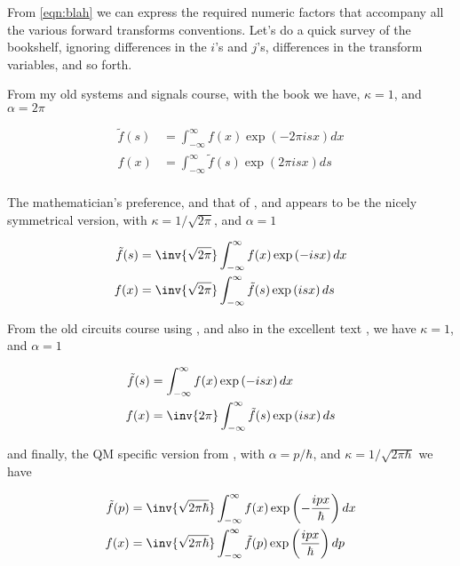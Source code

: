 \documentclass{article}
\newcommand{\IIinf}[0]{ \int_{-\infty}^\infty }
\begin{document}
From \ref{eqn:blah} we can 
express the required numeric factors that accompany all the various forward transforms conventions.  Let's do a quick survey of the bookshelf, ignoring differences in the $i$'s and $j$'s, differences in the transform variables, and so forth.

From my old systems and signals course, with the book \cite{haykin1994cs} we have, $\kappa = 1$, and $\alpha = 2 \pi$

\begin{align*}
\tilde{f}(s) &= \IIinf f(x) \exp\left( - 2 \pi i s x \right) dx \\
f(x) &= \IIinf \tilde{f}(s) \exp\left( 2 \pi i s x \right) ds \\
\end{align*}

The mathematician's preference, and that of
\cite{bohm1989qt}, and \cite{byron1992mca} appears to be the nicely symmetrical version, with $\kappa = 1/\sqrt{2\pi}$, and $\alpha = 1$

\begin{align*}
\tilde{f}(s) &= \inv{\sqrt{2\pi}} \IIinf f(x) \exp\left( - i  s x \right) dx \\
f(x) &= \inv{\sqrt{2 \pi}} \IIinf \tilde{f}(s) \exp\left( i  s x \right) ds \\
\end{align*}

From the old circuits course using \cite{irwin2007bec}, and also in the excellent text \cite{lepage1980cva}, we have $\kappa = 1$, and $\alpha = 1$

\begin{align*}
\tilde{f}(s) &= \IIinf f(x) \exp\left( - i  s x \right) dx  \\
f(x) &= \inv{{2 \pi}} \IIinf \tilde{f}(s) \exp\left( i  s x \right) ds \\
\end{align*}

and finally, the QM specific version from \cite{mcmahon2005qmd}, with $\alpha = p/\hbar$, and $\kappa = 1/\sqrt{2\pi \hbar}$ we have

\begin{align*}
\tilde{f}(p) &= \inv{\sqrt{2\pi \hbar}} \IIinf f(x) \exp\left( - \frac{i  p x}{\hbar} \right) dx \\
f(x) &= \inv{\sqrt{2 \pi \hbar}} \IIinf \tilde{f}(p) \exp\left( \frac{i  p x}{\hbar} \right) dp \\
\end{align*}



\end{document}
